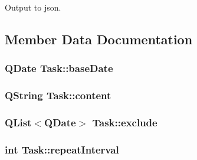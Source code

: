 Output to json. 



\subsection{Member Data Documentation}
\subsubsection[{\texorpdfstring{base\+Date}{baseDate}}]{\setlength{\rightskip}{0pt plus 5cm}Q\+Date Task\+::base\+Date\hspace{0.3cm}{\ttfamily [private]}}\hypertarget{classTask_a20cc2347b30cba60fb1da685ef8756c5}{}\label{classTask_a20cc2347b30cba60fb1da685ef8756c5}
\subsubsection[{\texorpdfstring{content}{content}}]{\setlength{\rightskip}{0pt plus 5cm}Q\+String Task\+::content\hspace{0.3cm}{\ttfamily [private]}}\hypertarget{classTask_a9432e6a8bd681ddff95d3ee646193267}{}\label{classTask_a9432e6a8bd681ddff95d3ee646193267}
\subsubsection[{\texorpdfstring{exclude}{exclude}}]{\setlength{\rightskip}{0pt plus 5cm}Q\+List$<$Q\+Date$>$ Task\+::exclude\hspace{0.3cm}{\ttfamily [private]}}\hypertarget{classTask_a7ea8d8cc5ad0786d7e1b0bbc34f58863}{}\label{classTask_a7ea8d8cc5ad0786d7e1b0bbc34f58863}
\subsubsection[{\texorpdfstring{repeat\+Interval}{repeatInterval}}]{\setlength{\rightskip}{0pt plus 5cm}int Task\+::repeat\+Interval\hspace{0.3cm}{\ttfamily [private]}}\hypertarget{classTask_af61e693a3a2dec42646081d60c57df3e}{}\label{classTask_af61e693a3a2dec42646081d60c57df3e}
